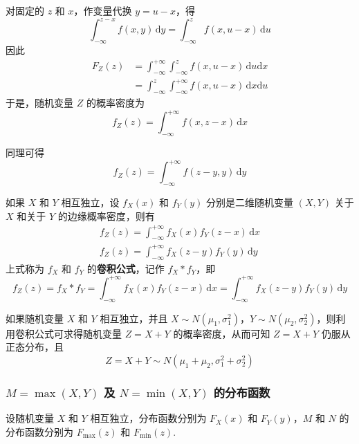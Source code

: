 对固定的 $z$ 和 $x$，作变量代换 $y=u-x$，得
$$
\int_{-\infty}^{z-x} f(x,y) \, \text{d}y = \int_{-\infty}^z f(x,u-x) \, \text{d}u
$$
因此
$$
\begin{aligned}
    F_{Z}(z) &= \int_{-\infty}^{+\infty} \int_{-\infty}^z f(x,u-x) \, \text{d}u \text{d}x \\
    &= \int_{-\infty}^z \int_{-\infty}^{+\infty} f(x,u-x) \, \text{d}x \text{d}u 
\end{aligned}
$$
于是，随机变量 $Z$ 的概率密度为
$$
f_{Z}(z) = \int_{-\infty}^{+\infty} f(x,z-x) \, \text{d}x
$$

同理可得
$$
f_{Z}(z) = \int_{-\infty}^{+\infty} f(z-y,y) \, \text{d}y
$$

如果 $X$ 和 $Y$ 相互独立，设 $f_{X}(x)$ 和 $f_{Y}(y)$ 分别是二维随机变量 $(X,Y)$ 关于 $X$ 和关于 $Y$ 的边缘概率密度，则有
\begin{gather*}
    f_{Z}(z) = \int_{-\infty}^{+\infty} f_{X}(x) f_{Y}(z-x) \, \text{d}x \\
    f_{Z}(z) = \int_{-\infty}^{+\infty} f_{X}(z-y) f_{Y}(y) \, \text{d}y
\end{gather*}
上式称为 $f_X$ 和 $f_Y$ 的\textbf{卷积公式}，记作 $f_X * f_Y$，即
\begin{equation}
    f_{Z}(z) = f_X * f_Y = \int_{-\infty}^{+\infty} f_{X}(x) f_{Y}(z-x) \, \text{d}x = \int_{-\infty}^{+\infty} f_{X}(z-y) f_{Y}(y) \, \text{d}y
\end{equation}

如果随机变量 $X$ 和 $Y$ 相互独立，并且 $X \sim N(\mu_1,\sigma_1^2)$，$Y \sim N(\mu_2,\sigma_2^2)$，则利用卷积公式可求得随机变量 $Z=X+Y$ 的概率密度，从而可知 $Z=X+Y$ 仍服从正态分布，且
$$
Z = X+Y \sim N(\mu_1 + \mu_2, \sigma_1^2 + \sigma_2^2)
$$

\subsubsection{$M = \max(X,Y)$ 及 $N = \min(X,Y)$ 的分布函数}

设随机变量 $X$ 和 $Y$ 相互独立，分布函数分别为 $F_{X}(x)$ 和 $F_{Y}(y)$，$M$ 和 $N$ 的分布函数分别为 $F_{\text{max}}(z)$ 和 $F_{\text{min}}(z)$.